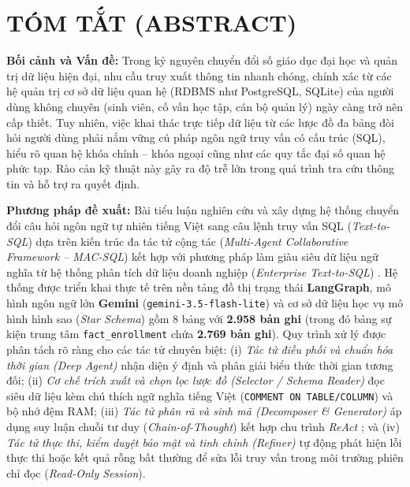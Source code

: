 \documentclass[12pt,a4paper]{report}
\begin{document}
\setcounter{page}{1}

\chapter*{TÓM TẮT (ABSTRACT)}

\noindent\textbf{Bối cảnh và Vấn đề:} Trong kỷ nguyên chuyển đổi số giáo dục đại học và quản trị dữ liệu hiện đại, nhu cầu truy xuất thông tin nhanh chóng, chính xác từ các hệ quản trị cơ sở dữ liệu quan hệ (RDBMS như PostgreSQL, SQLite) của người dùng không chuyên (sinh viên, cố vấn học tập, cán bộ quản lý) ngày càng trở nên cấp thiết. Tuy nhiên, việc khai thác trực tiếp dữ liệu từ các lược đồ đa bảng đòi hỏi người dùng phải nắm vững cú pháp ngôn ngữ truy vấn có cấu trúc (SQL), hiểu rõ quan hệ khóa chính -- khóa ngoại cũng như các quy tắc đại số quan hệ phức tạp. Rào cản kỹ thuật này gây ra độ trễ lớn trong quá trình tra cứu thông tin và hỗ trợ ra quyết định.

\noindent\textbf{Phương pháp đề xuất:} Bài tiểu luận nghiên cứu và xây dựng hệ thống chuyển đổi câu hỏi ngôn ngữ tự nhiên tiếng Việt sang câu lệnh truy vấn SQL (\textit{Text-to-SQL}) dựa trên kiến trúc đa tác tử cộng tác (\textit{Multi-Agent Collaborative Framework -- MAC-SQL}) \cite{wang2025macsql} kết hợp với phương pháp làm giàu siêu dữ liệu ngữ nghĩa từ hệ thống phân tích dữ liệu doanh nghiệp (\textit{Enterprise Text-to-SQL}) \cite{chen2025enterprise}. Hệ thống được triển khai thực tế trên nền tảng đồ thị trạng thái \textbf{LangGraph}, mô hình ngôn ngữ lớn \textbf{Gemini} (\texttt{gemini-3.5-flash-lite}) và cơ sở dữ liệu học vụ mô hình hình sao (\textit{Star Schema}) gồm 8 bảng với \textbf{2.958 bản ghi} (trong đó bảng sự kiện trung tâm \texttt{fact\_enrollment} chứa \textbf{2.769 bản ghi}). Quy trình xử lý được phân tách rõ ràng cho các tác tử chuyên biệt: (i) \textit{Tác tử điều phối và chuẩn hóa thời gian (Deep Agent)} nhận diện ý định và phân giải biểu thức thời gian tương đối; (ii) \textit{Cơ chế trích xuất và chọn lọc lược đồ (Selector / Schema Reader)} đọc siêu dữ liệu kèm chú thích ngữ nghĩa tiếng Việt (\texttt{COMMENT ON TABLE/COLUMN}) và bộ nhớ đệm RAM; (iii) \textit{Tác tử phân rã và sinh mã (Decomposer \& Generator)} áp dụng suy luận chuỗi tư duy (\textit{Chain-of-Thought}) kết hợp chu trình \textit{ReAct} \cite{yao2023react}; và (iv) \textit{Tác tử thực thi, kiểm duyệt bảo mật và tinh chỉnh (Refiner)} tự động phát hiện lỗi thực thi hoặc kết quả rỗng bất thường để sửa lỗi truy vấn trong môi trường phiên chỉ đọc (\textit{Read-Only Session}).
\end{document}
